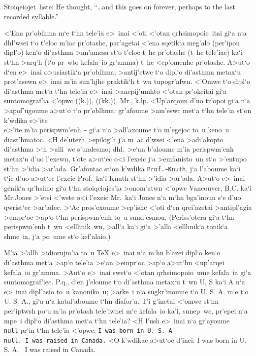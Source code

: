 \exercise Stoiqeiojet~hste: {\rm He thought, ``\dots and this goes on
forever, perhaps to the last recorded syllable.'' }

<'Ena pr'oblhma m`e t`hn tele'ia e>~inai <'oti <'otan qrhsimopoie~itai  
gi`a n`a dhl'wsei t`o t'eloc m'iac pr'otashc, par'agetai <'ena sqetik`a 
meg'alo (per'ipou dipl'o) ken`o di'asthma >an'amesa st`o t'eloc t~hc
pr'otashc (t~hc tele'iac) ka`i st`hn >arq'h (t`o pr~wto kefala~io  
gr'amma) t~hc <ep'omenhc pr'otashc.  A>ut`o d`en e>~inai o>usia\-stik`a 
pr'o\-blhma; >antij'etwc t`o dipl`o di'asthma metax`u prot'a\-se\-wn     
e>~inai m'ia sun'hjhc praktik`h t~wn tupogr'afwn.  <'Omwc t`o dipl`o    
di'asthma met`a t`hn tele'ia e>~inai >anepij'umhto <'otan pr'o\-keitai  
gi`a suntomo\-graf'ia <'opwc ((k.)), ((kk.)), {\rm Mr.}, k.lp.
<Up'arqoun d'uo tr'opoi gi`a n`a >apof'ugoume a>ut`o t`o pr'oblhma:
gr'afoume >am'eswc met`a t`hn tele'ia st`on k'wdika e>'ite {\tt\\\sp}
e>'ite m'ia perispwm'enh {\tt\~{}} gi`a n`a >all'axoume t`o m'egejoc to~u
keno~u diast'hmatoc.%
<H de'uterh >epilog`h j`a m~ac d'wsei <'ena {\tengs >adi\-'ako\-pto
di'asthma\/} >`h >alli~wc {\tengs s'un\-desmo\/}; dhl.\ >e`an b'aloume
m'ia peri\-spw\-m'enh metax`u d'uo l'exewn, t'ote a>ut`ec o<i l'exeic
j`a >emfa\-nisto~un st`o >'entupo st`hn >'idia >ar'ada.  Gr'afontac    
st`on k'wdika {\tt Prof.\~{}Knuth}, j`a l'aboume ka`i t`ic d'uo         
a>ut`ec l'exeic {\rm Prof.}\ ka`i {\rm Knuth} st`hn >'idia
>ar'ada. A>ut`o e>~inai genik`a qr'h\-simo gi`a t`hn stoiqei\-ojes'ia
>onom'atwn <'opwc {\rm Vancouver, B.\NB C.} ka`i {\rm Mr.\NB Jones}
>'etsi <'wste o<i l'exeic {\rm Mr.}\ ka`i {\rm Jones} n`a m`hn
bga'inoun s`e d'uo qwrist`ec >ar'adec.  >`Ac pro\-s'e\-xoume >ep'ishc
<'oti d`en qrei'azetai >antipl'agia >empr`oc >ap`o t`hn peri\-spw\-m'enh
to~u sund'esmou.  (Periss'otera gi`a t`hn perispwm'enh t~wn <ellhnik~wn,
>all`a ka`i gi`a >'alla <ellhnik`a tonik`a shme~ia, j`a po~ume st`o
kef'alaio.)

M'ia >'allh >idiorujm'ia to~u {\rm \TeX} e>~inai n`a m`hn b'azei dipl`o
ken`o di'asthma met`a >ap`o tele'ia >e`an >empr`oc >ap`o a>ut`hn
<up'arqei kefala~io gr'amma.  >Aut`o e>~inai swst`o <'otan
qrhsimopoio~ume kefala~ia gi`a suntomograf'iec. P.q., d`en j'eloume t`o
di'asthma metax`u t~wn {\rm U}, {\rm S} ka`i {\rm A} n`a e>~inai
dipl'asio to~u kanoniko~u; >arke~i n`a sugkr'inoume t`o {\rm U\null.
S\null. A.} m`e t`o {\rm U. S. A.}, gi`a n`a katal'aboume t`hn diafor'a.
 T'i g'inetai <'omwc st`hn per'iptwsh po`u m'ia pr'otash tele'iwnei m`e
kefala~io ka'i, sunep~wc, pr'epei n`a mpe~i dipl`o di'asthma met`a t`hn
tele'ia?  <H l'ush e>~inai n`a gr'ayoume {\tt\\null} pr`in t`hn tele'ia
<'opwc: {\tt I was born in U. S. A\\null.\ I was raised in Canada.} <O
k'wdikac a>ut`oc d'inei: {\rm I was born in U. S. A\null. \ I was raised in
Canada.}

